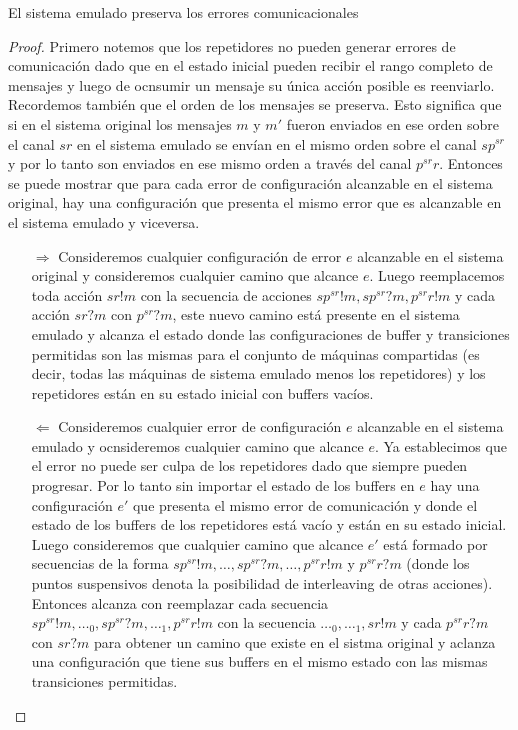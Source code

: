 \begin{prop} El sistema emulado preserva los errores comunicacionales

\begin{proof} Primero notemos que los repetidores no pueden generar errores de comunicación dado que en el estado inicial pueden recibir el rango completo de mensajes y luego de ocnsumir un mensaje su única acción posible es reenviarlo. Recordemos también que el orden de los mensajes se preserva. Esto significa que si en el sistema original los mensajes $ m $ y $m'$ fueron enviados en ese orden sobre el canal $sr$ en el sistema emulado se envían en el mismo orden sobre el canal $sp^{sr}$ y por lo tanto son enviados en ese mismo orden a través del canal $p^{sr}r$. Entonces se puede mostrar que para cada error de configuración alcanzable en el sistema original, hay una configuración que presenta el mismo error que es alcanzable en el sistema emulado y viceversa.
\begin{itemize}
\item[$\Rightarrow$] Consideremos cualquier configuración de error $e$ alcanzable en el sistema original y consideremos cualquier camino que alcance $e$. Luego reemplacemos toda acción $sr!m$ con la secuencia de acciones $sp^{sr}!m, sp^{sr}?m, p^{sr}r!m$ y cada acción $sr?m$ con $p^{sr}?m$, este nuevo camino está presente en el sistema emulado y alcanza el estado donde las configuraciones de buffer y transiciones permitidas son las mismas para el conjunto de máquinas compartidas (es decir, todas las máquinas de sistema emulado menos los repetidores) y los repetidores están en su estado inicial con buffers vacíos.
\item[$\Leftarrow$] Consideremos cualquier error de configuración $e$ alcanzable en el sistema emulado y ocnsideremos cualquier camino que alcance $e$. Ya establecimos que el error no puede ser culpa de los repetidores dado que siempre pueden progresar. Por lo tanto sin importar el estado de los buffers en $e$ hay una configuración $e'$ que presenta el mismo error de comunicación y donde el estado de los buffers de los repetidores está vacío y están en su estado inicial. Luego consideremos que cualquier camino que alcance $e'$ está formado por secuencias de la forma $sp^{sr}!m,\ldots, sp^{sr}?m, \ldots, p^{sr}r!m$ y $p^{sr}r?m$ (donde los puntos suspensivos denota la posibilidad de interleaving de otras acciones). Entonces alcanza con reemplazar cada secuencia $sp^{sr}!m,\ldots_0, sp^{sr}?m, \ldots_1, p^{sr}r!m$ con la secuencia $\ldots_0,\ldots_1, sr!m$ y cada $p^{sr}r?m$ con $sr?m$ para obtener un camino que existe en el sistma original y aclanza una configuración que tiene sus buffers en el mismo estado con las mismas transiciones permitidas.
\end{itemize}

\end{proof}

\end{prop}
